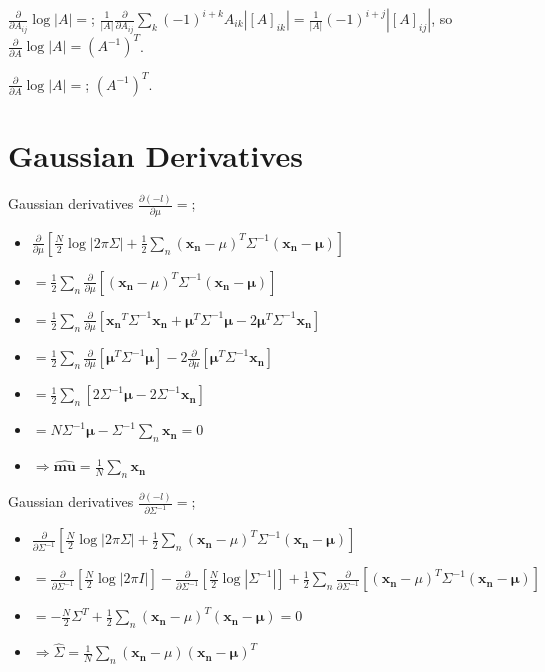 \documentclass{article}
\begin{document}
$\frac{\partial}{\partial A_{ij}}\log|A|=$; $\frac{1}{|A|}\frac{\partial}{\partial A_{ij}}\sum_{k}(-1)^{i+k}A_{ik}|[A]_{ik}|=\frac{1}{|A|}(-1)^{i+j}|[A]_{ij}|$, so \newline $\frac{\partial}{\partial A}\log|A| = (A^{-1})^T$.

$\frac{\partial}{\partial A}\log|A| =$; $(A^{-1})^T$.

\section{Gaussian Derivatives} 

Gaussian derivatives $\frac{\partial(-l)}{\partial\mu}= $; \begin{itemize} \item $\frac{\partial}{\partial\mu}[\frac{N}{2}\log|2\pi\Sigma|+\frac{1}{2}\sum_n(\mathbf{x_n}-\mu)^T\Sigma^{-1}(\mathbf{x_n-\mu})]$ \item $=\frac{1}{2}\sum_n\frac{\partial}{\partial\mu}[ (\mathbf{x_n}-\mu)^T\Sigma^{-1}(\mathbf{x_n-\mu})]$ \item $=\frac{1}{2}\sum_n\frac{\partial}{\partial\mu}[\mathbf{x_n}^T\Sigma^{-1}\mathbf{x_n}+\mathbf{\mu}^T\Sigma^{-1}\mathbf{\mu}-2\mathbf{\mu}^T\Sigma^{-1}\mathbf{x_n}]$ \item $=\frac{1}{2}\sum_n\frac{\partial}{\partial\mu}[\mathbf{\mu}^T\Sigma^{-1}\mathbf{\mu}] - 2\frac{\partial}{\partial\mu}[\mathbf{\mu}^T\Sigma^{-1}\mathbf{x_n}]$  \item $=\frac{1}{2}\sum_n[2\Sigma^{-1}\mathbf{\mu} - 2\Sigma^{-1}\mathbf{x_n}]$ \item $=N\Sigma^{-1}\mathbf{\mu} - \Sigma^{-1}\sum_n\mathbf{x_n}=0$ \item $\Rightarrow \hat{\mathbf{mu}} = \frac{1}{N}\sum_n\mathbf{x_n}$ \end{itemize} 

Gaussian derivatives $\frac{\partial(-l)}{\partial\Sigma^{-1}} = $; \begin{itemize} \item $\frac{\partial}{\partial\Sigma^{-1}}[\frac{N}{2}\log|2\pi\Sigma|+\frac{1}{2}\sum_n(\mathbf{x_n}-\mu)^T\Sigma^{-1}(\mathbf{x_n-\mu})]$ \item  $=\frac{\partial}{\partial\Sigma^{-1}}[\frac{N}{2}\log|2\pi I|] - \frac{\partial}{\partial\Sigma^{-1}}[\frac{N}{2}\log|\Sigma^{-1}|]+\frac{1}{2}\sum_n\frac{\partial}{\partial\Sigma^{-1}}[(\mathbf{x_n}-\mu)^T\Sigma^{-1}(\mathbf{x_n-\mu})]$ \item $ = -\frac{N}{2}\Sigma^T+\frac{1}{2}\sum_n (\mathbf{x_n}-\mu)^T(\mathbf{x_n-\mu}) = 0$ \item $\Rightarrow \hat{\Sigma}=\frac{1}{N}\sum_n(\mathbf{x_n}-\mu)(\mathbf{x_n-\mu})^T$ \end{itemize}
\end{document}
